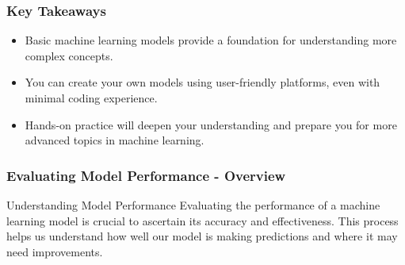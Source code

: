 \documentclass[aspectratio=169]{beamer}
\begin{document}
\begin{frame}[fragile]
    \frametitle{Key Takeaways}
    \begin{itemize}
        \item Basic machine learning models provide a foundation for understanding more complex concepts.
        \item You can create your own models using user-friendly platforms, even with minimal coding experience.
        \item Hands-on practice will deepen your understanding and prepare you for more advanced topics in machine learning.
    \end{itemize}
\end{frame}

\begin{frame}[fragile]
    \frametitle{Evaluating Model Performance - Overview}
    \begin{block}{Understanding Model Performance}
        Evaluating the performance of a machine learning model is crucial to ascertain its accuracy and effectiveness. This process helps us understand how well our model is making predictions and where it may need improvements.
    \end{block}
\end{frame}
\end{document}
